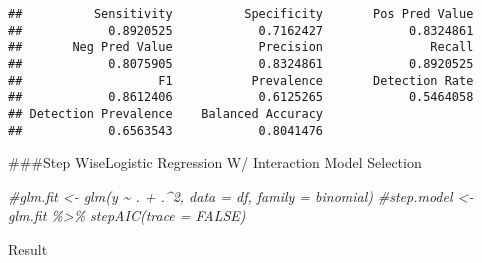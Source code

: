 \documentclass[
]{article}
\newenvironment{Shaded}{\begin{snugshade}}{\end{snugshade}}
\newcommand{\CommentTok}[1]{\textcolor[rgb]{0.56,0.35,0.01}{\textit{#1}}}
\newcommand{\FunctionTok}[1]{\textcolor[rgb]{0.00,0.00,0.00}{#1}}
\newcommand{\NormalTok}[1]{#1}
\newcommand{\SpecialCharTok}[1]{\textcolor[rgb]{0.00,0.00,0.00}{#1}}
\begin{document}
\begin{Shaded}
\end{Shaded}

\begin{verbatim}
##          Sensitivity          Specificity       Pos Pred Value 
##            0.8920525            0.7162427            0.8324861 
##       Neg Pred Value            Precision               Recall 
##            0.8075905            0.8324861            0.8920525 
##                   F1           Prevalence       Detection Rate 
##            0.8612406            0.6125265            0.5464058 
## Detection Prevalence    Balanced Accuracy 
##            0.6563543            0.8041476
\end{verbatim}

\#\#\#Step WiseLogistic Regression W/ Interaction Model Selection

\begin{Shaded}
\begin{Highlighting}[]
\CommentTok{\#glm.fit \textless{}{-} glm(y \textasciitilde{} . + .\^{}2, data = df, family = binomial)}
\CommentTok{\#step.model \textless{}{-} glm.fit \%\textgreater{}\% stepAIC(trace = FALSE)}
\end{Highlighting}
\end{Shaded}

Result

\begin{Shaded}
\end{Shaded}
\end{document}
